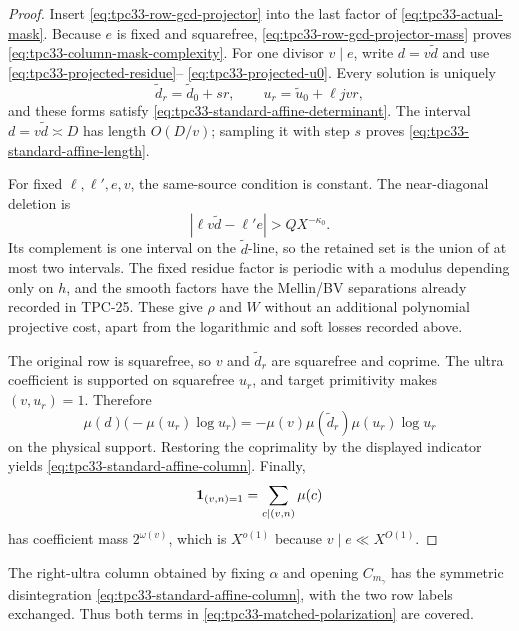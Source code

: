 \begin{proof}
Insert \eqref{eq:tpc33-row-gcd-projector} into the last factor of
\eqref{eq:tpc33-actual-mask}.  Because \(e\) is fixed and squarefree,
\eqref{eq:tpc33-row-gcd-projector-mass} proves
\eqref{eq:tpc33-column-mask-complexity}.  For one divisor \(v\mid e\),
write \(d=v\widetilde d\) and use
\eqref{eq:tpc33-projected-residue}--
\eqref{eq:tpc33-projected-u0}.  Every solution is uniquely
\begin{equation}
 \widetilde d_r=\widetilde d_0+sr,
 \qquad
 u_r=\widetilde u_0+\ell jv r,
 \label{eq:tpc33-projected-affine-forms}
\end{equation}
and these forms satisfy
\eqref{eq:tpc33-standard-affine-determinant}.  The interval
\(d=v\widetilde d\asymp D\) has length \(O(D/v)\); sampling it with step
\(s\) proves \eqref{eq:tpc33-standard-affine-length}.

For fixed \(\ell,\ell',e,v\), the same-source condition is constant.  The
near-diagonal deletion is
\[
 |\ell v\widetilde d-\ell'e|>QX^{-\kappa_0}.
\]
Its complement is one interval on the \(\widetilde d\)-line, so the
retained set is the union of at most two intervals.  The fixed residue
factor is periodic with a modulus depending only on \(h\), and the smooth
 factors have the Mellin/BV separations already recorded in TPC-25.  These
 give \(\rho\) and \(W\) without an additional polynomial projective cost,
 apart from the logarithmic and soft losses recorded above.

The original row is squarefree, so \(v\) and \(\widetilde d_r\) are
squarefree and coprime.  The ultra coefficient is supported on squarefree
\(u_r\), and target primitivity makes \((v,u_r)=1\).  Therefore
\begin{equation}
 \mu(d)\bigl(-\mu(u_r)\log u_r\bigr)
 =-\mu(v)\mu(\widetilde d_r)\mu(u_r)\log u_r
 \label{eq:tpc33-projected-sign-fusion}
\end{equation}
on the physical support.  Restoring the coprimality by the displayed
indicator yields \eqref{eq:tpc33-standard-affine-column}.  Finally,
\[
 \mathbf 1_{(v,n)=1}=\sum_{c\mid(v,n)}\mu(c)
\]
has coefficient mass \(2^{\omega(v)}\), which is \(X^{o(1)}\) because
\(v\mid e\ll X^{O(1)}\).
\end{proof}

\begin{corollary}
\label{cor:tpc33-both-column-disintegrations}
The right-ultra column obtained by fixing \(\alpha\) and opening
\(C_{m_\gamma}\) has the symmetric disintegration
\eqref{eq:tpc33-standard-affine-column}, with the two row labels exchanged.
Thus both terms in \eqref{eq:tpc33-matched-polarization} are covered.
\end{corollary}

